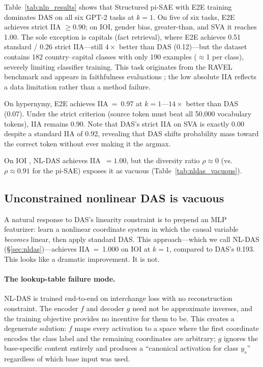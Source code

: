 \documentclass{article}
\begin{document}
Table~\ref{tab:nlp_results} shows that Structured pi-SAE with E2E training
dominates DAS on all six GPT-2 tasks at $k{=}1$. On five of six tasks, E2E
achieves strict IIA $\geq 0.90$; on IOI, gender bias, greater-than, and SVA
it reaches 1.00. The sole exception is capitals (fact retrieval), where
E2E achieves 0.51 standard / 0.26 strict IIA---still $4\times$ better than
DAS (0.12)---but the dataset contains 182 country--capital classes with only
190 examples ($\approx$1 per class), severely limiting classifier training.
This task originates from the RAVEL benchmark \citep{huang2024ravel} and
appears in faithfulness evaluations \citep{prakash2024mib}; the low absolute
IIA reflects a data limitation rather than a method failure.

On hypernymy, E2E achieves IIA~=~0.97 at $k{=}1$---$14\times$ better than
DAS (0.07). Under the strict criterion (source token must beat all 50{,}000
vocabulary tokens), IIA remains 0.90. Note that DAS's strict IIA on SVA is
exactly 0.00 despite a standard IIA of 0.92, revealing that DAS shifts
probability mass toward the correct token without ever making it the argmax.

On IOI \citep{wang2022interpretability}, NL-DAS achieves IIA~$= 1.00$,
but the diversity ratio $\rho \approx 0$ (vs.\ $\rho \approx 0.91$ for the
pi-SAE) exposes it as vacuous (Table~\ref{tab:nldas_vacuous}).

\subsection{Unconstrained nonlinear DAS is vacuous}
\label{sec:nldas_vacuous}

A natural response to DAS's linearity constraint is to prepend an MLP
featurizer: learn a nonlinear coordinate system in which the causal variable
\emph{becomes} linear, then apply standard DAS. This approach---which we call
NL-DAS (\S\ref{sec:nldas})---achieves IIA~=~1.000 on IOI at $k = 1$, compared
to DAS's 0.193. This looks like a dramatic improvement. It is not.

\paragraph{The lookup-table failure mode.}
NL-DAS is trained end-to-end on interchange loss with no reconstruction
constraint. The encoder $f$ and decoder $g$ need not be approximate inverses,
and the training objective provides no incentive for them to be. This creates a
degenerate solution: $f$ maps every activation to a space where the first
coordinate encodes the class label and the remaining coordinates are arbitrary;
$g$ ignores the base-specific content entirely and produces a ``canonical
activation for class $y_s$'' regardless of which base input was used.
\end{document}
